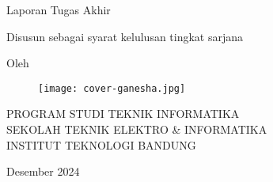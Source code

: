 \clearpage
\pagestyle{empty}

\begin{center}
  \smallskip

  \Large \bfseries \MakeUppercase{\thetitle}
  \vfill

  \Large Laporan Tugas Akhir
  \vfill

  \large Disusun sebagai syarat kelulusan tingkat sarjana
  \vfill

  \large Oleh

  \Large \theauthor

  \vfill
  \begin{figure}[ht]
    \centering
    \texttt{[image: cover-ganesha.jpg]}
  \end{figure}
  \vfill

  \large
  \uppercase{
    Program Studi Teknik Informatika \\
    Sekolah Teknik Elektro \& Informatika \\
    Institut Teknologi Bandung
  }

  Desember 2024

\end{center}

\clearpage
